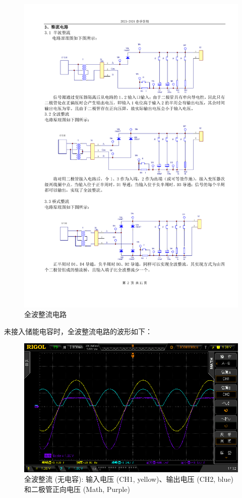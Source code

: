 \documentclass[UTF8]{article}
\begin{document}
\begin{figure}[H]\centering
    \includegraphics[width=0.9\columnwidth]{LCE-01-二极管/assets/实验原理/电路图 copy 2.pdf}
    \caption{全波整流电路}
    \label{fig: full-wave rectifier circuit}
\end{figure}

未接入储能电容时，全波整流电路的波形如下：

\begin{figure}[H]\centering
    \includegraphics[width=\columnwidth]{LCE-01-二极管/assets/二极管整流电路/全波整流-无电容-电压波形.png}
    \caption{全波整流 (无电容): 输入电压 (CH1, yellow)、输出电压 (CH2, blue) 和二极管正向电压 (Math, Purple)}
\end{figure}
\end{document}
